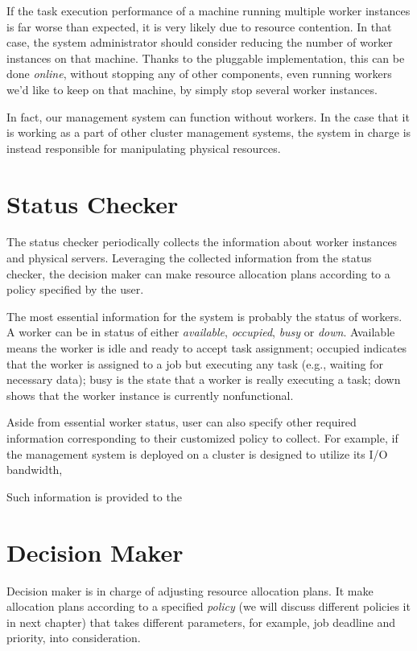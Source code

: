 If the task execution performance of a machine running multiple worker
instances is far worse than expected, it is very likely due to resource
contention.  In that case, the system administrator should consider
reducing the number of worker instances on that machine.  Thanks to the
pluggable implementation, this can be done \emph{online}, without
stopping any of other components, even running workers we'd like to keep
on that machine, by simply stop several worker instances.

In fact, our management system can function without workers.  In the
case that it is working as a part of other cluster management systems,
the system in charge is instead responsible for manipulating physical
resources.

\section{Status Checker}

The status checker periodically collects the information about worker
instances and physical servers.  Leveraging the collected information
from the status checker, the decision maker can make resource allocation
plans according to a policy specified by the user.

The most essential information for the system is probably the status of
workers.  A worker can be in status of either \emph{available},
\emph{occupied}, \emph{busy} or \emph{down}.  Available means the worker
is idle and ready to accept task assignment; occupied indicates that the
worker is assigned to a job but executing any task (e.g., waiting for
necessary data); busy is the state that a worker is really executing a
task; down shows that the worker instance is currently nonfunctional. 

Aside from essential worker status, user can
also specify other required information corresponding to their
customized policy to collect.  For example, if the management system is
deployed on a cluster is designed to
utilize its I/O bandwidth, 

Such information is provided to the 

\section{Decision Maker}

Decision maker is in charge of adjusting resource allocation plans.  It
make allocation plans according to a specified \emph{policy} (we will
discuss different policies it in next chapter) that takes different
parameters, for example, job deadline and priority, into consideration. 

